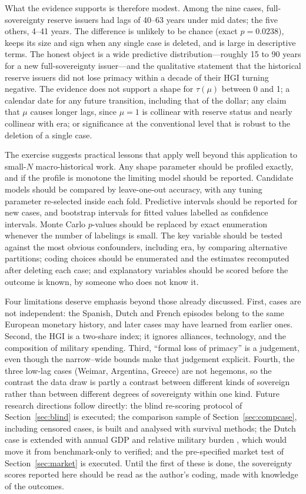 \documentclass[11pt,letterpaper]{article}
\theoremstyle{definition}
\theoremstyle{plain}
\begin{document}
What the evidence supports is therefore modest. Among the nine cases, full-sovereignty reserve issuers had lags of 40--63 years under mid dates; the five others, 4--41 years. The difference is unlikely to be chance (exact $p=0.0238$), keeps its size and sign when any single case is deleted, and is large in descriptive terms. The honest object is a wide predictive distribution---roughly 15 to 90 years for a new full-sovereignty issuer---and the qualitative statement that the historical reserve issuers did not lose primacy within a decade of their HGI turning negative. The evidence does not support a shape for $\tau(\mu)$ between 0 and 1; a calendar date for any future transition, including that of the dollar; any claim that $\mu$ causes longer lags, since $\mu=1$ is collinear with reserve status and nearly collinear with era; or significance at the conventional level that is robust to the deletion of a single case.

The exercise suggests practical lessons that apply well beyond this application to small-$N$ macro-historical work. Any shape parameter should be profiled exactly, and if the profile is monotone the limiting model should be reported. Candidate models should be compared by leave-one-out accuracy, with any tuning parameter re-selected inside each fold. Predictive intervals should be reported for new cases, and bootstrap intervals for fitted values labelled as confidence intervals. Monte Carlo $p$-values should be replaced by exact enumeration whenever the number of labelings is small. The key variable should be tested against the most obvious confounders, including era, by comparing alternative partitions; coding choices should be enumerated and the estimates recomputed after deleting each case; and explanatory variables should be scored before the outcome is known, by someone who does not know it.

Four limitations deserve emphasis beyond those already discussed. First, cases are not independent: the Spanish, Dutch and French episodes belong to the same European monetary history, and later cases may have learned from earlier ones. Second, the HGI is a two-share index; it ignores alliances, technology, and the composition of military spending. Third, ``formal loss of primacy'' is a judgement, even though the narrow--wide bounds make that judgement explicit. Fourth, the three low-lag cases (Weimar, Argentina, Greece) are not hegemons, so the contrast the data draw is partly a contrast between different kinds of sovereign rather than between different degrees of sovereignty within one kind. Future research directions follow directly: the blind re-scoring protocol of Section~\ref{sec:blind} is executed; the comparison sample of Section~\ref{sec:compcase}, including censored cases, is built and analysed with survival methods; the Dutch case is extended with annual GDP \citep{vanzanden2012} and relative military burden \citep{glete2002,thart2014,tracy2008}, which would move it from benchmark-only to verified; and the pre-specified market test of Section~\ref{sec:market} is executed. Until the first of these is done, the sovereignty scores reported here should be read as the author's coding, made with knowledge of the outcomes.
\end{document}
